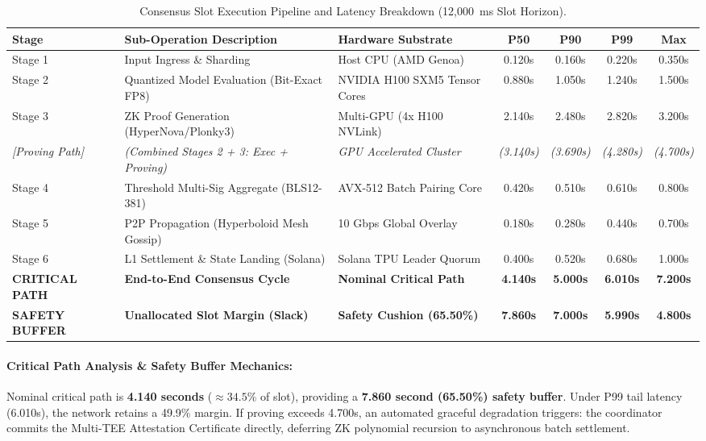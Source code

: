 \documentclass[10pt,twocolumn,letterpaper]{article}
\begin{document}
\begin{table}[t]
\centering
\small
\caption{Consensus Slot Execution Pipeline and Latency Breakdown (12,000~ms Slot Horizon).}
\label{tab:slot_pipeline}
\begin{tabularx}{\textwidth}{lXlcccc}
\toprule
\textbf{Stage} & \textbf{Sub-Operation Description} & \textbf{Hardware Substrate} & \textbf{P50} & \textbf{P90} & \textbf{P99} & \textbf{Max} \\
\midrule
Stage 1 & Input Ingress \& Sharding & Host CPU (AMD Genoa) & 0.120s & 0.160s & 0.220s & 0.350s \\
Stage 2 & Quantized Model Evaluation (Bit-Exact FP8) & NVIDIA H100 SXM5 Tensor Cores & 0.880s & 1.050s & 1.240s & 1.500s \\
Stage 3 & ZK Proof Generation (HyperNova/Plonky3) & Multi-GPU (4x H100 NVLink) & 2.140s & 2.480s & 2.820s & 3.200s \\
\textit{[Proving Path]} & \textit{(Combined Stages 2 + 3: Exec + Proving)} & \textit{GPU Accelerated Cluster} & \textit{(3.140s)} & \textit{(3.690s)} & \textit{(4.280s)} & \textit{(4.700s)} \\
Stage 4 & Threshold Multi-Sig Aggregate (BLS12-381) & AVX-512 Batch Pairing Core & 0.420s & 0.510s & 0.610s & 0.800s \\
Stage 5 & P2P Propagation (Hyperboloid Mesh Gossip) & 10 Gbps Global Overlay & 0.180s & 0.280s & 0.440s & 0.700s \\
Stage 6 & L1 Settlement \& State Landing (Solana) & Solana TPU Leader Quorum & 0.400s & 0.520s & 0.680s & 1.000s \\
\midrule
\textbf{CRITICAL PATH} & \textbf{End-to-End Consensus Cycle} & \textbf{Nominal Critical Path} & \textbf{4.140s} & \textbf{5.000s} & \textbf{6.010s} & \textbf{7.200s} \\
\textbf{SAFETY BUFFER} & \textbf{Unallocated Slot Margin (Slack)} & \textbf{Safety Cushion (65.50\%)} & \textbf{7.860s} & \textbf{7.000s} & \textbf{5.990s} & \textbf{4.800s} \\
\bottomrule
\end{tabularx}
\end{table}

\paragraph{Critical Path Analysis \& Safety Buffer Mechanics:}
Nominal critical path is \textbf{4.140 seconds} ($\approx 34.5\%$ of slot), providing a \textbf{7.860 second (65.50\%) safety buffer}. Under P99 tail latency (6.010s), the network retains a 49.9\% margin. If proving exceeds 4.700s, an automated graceful degradation triggers: the coordinator commits the Multi-TEE Attestation Certificate directly, deferring ZK polynomial recursion to asynchronous batch settlement.
\end{document}
